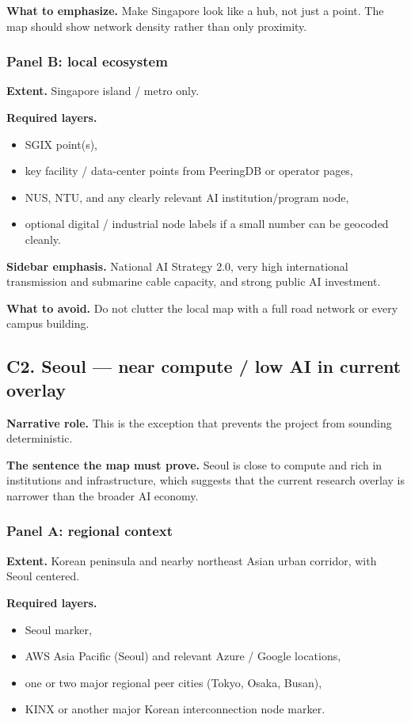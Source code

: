 \documentclass[11pt]{article}
\begin{document}
\textbf{What to emphasize.} Make Singapore look like a hub, not just a point. The map should show network density rather than only proximity.

\subsubsection*{Panel B: local ecosystem}
\textbf{Extent.} Singapore island / metro only.

\textbf{Required layers.}
\begin{itemize}[leftmargin=1.4em,itemsep=0.18em]
    \item SGIX point(s),
    \item key facility / data-center points from PeeringDB or operator pages,
    \item NUS, NTU, and any clearly relevant AI institution/program node,
    \item optional digital / industrial node labels if a small number can be geocoded cleanly.
\end{itemize}

\textbf{Sidebar emphasis.} National AI Strategy 2.0, very high international transmission and submarine cable capacity, and strong public AI investment.

\textbf{What to avoid.} Do not clutter the local map with a full road network or every campus building.

\subsection{C2. Seoul --- near compute / low AI in current overlay}

\textbf{Narrative role.} This is the exception that prevents the project from sounding deterministic.

\textbf{The sentence the map must prove.} Seoul is close to compute and rich in institutions and infrastructure, which suggests that the current research overlay is narrower than the broader AI economy.

\subsubsection*{Panel A: regional context}
\textbf{Extent.} Korean peninsula and nearby northeast Asian urban corridor, with Seoul centered.

\textbf{Required layers.}
\begin{itemize}[leftmargin=1.4em,itemsep=0.18em]
    \item Seoul marker,
    \item AWS Asia Pacific (Seoul) and relevant Azure / Google locations,
    \item one or two major regional peer cities (Tokyo, Osaka, Busan),
    \item KINX or another major Korean interconnection node marker.
\end{itemize}
\end{document}
